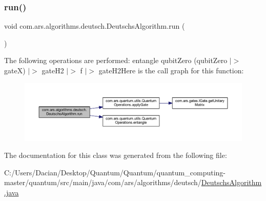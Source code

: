 \subsubsection{\texorpdfstring{run()}{run()}}
{\footnotesize\ttfamily void com.\+ars.\+algorithms.\+deutsch.\+Deutschs\+Algorithm.\+run (\begin{DoxyParamCaption}{ }\end{DoxyParamCaption})}

The following operations are performed\+: entangle qubit\+Zero (qubit\+Zero $\vert$$>$ gateX) $\vert$$>$ gate\+H2 $\vert$$>$ f $\vert$$>$ gate\+H2Here is the call graph for this function\+:\nopagebreak
\begin{figure}[H]
\begin{center}
\leavevmode
\includegraphics[width=350pt]{classcom_1_1ars_1_1algorithms_1_1deutsch_1_1_deutschs_algorithm_afb9f22b5a65a36c5a2828e7f06e4563e_cgraph}
\end{center}
\end{figure}


The documentation for this class was generated from the following file\+:\begin{DoxyCompactItemize}
\item 
C\+:/\+Users/\+Dacian/\+Desktop/\+Quantum/\+Quantum/quantum\+\_\+computing-\/master/quantum/src/main/java/com/ars/algorithms/deutsch/\hyperlink{_deutschs_algorithm_8java}{Deutschs\+Algorithm.\+java}\end{DoxyCompactItemize}
